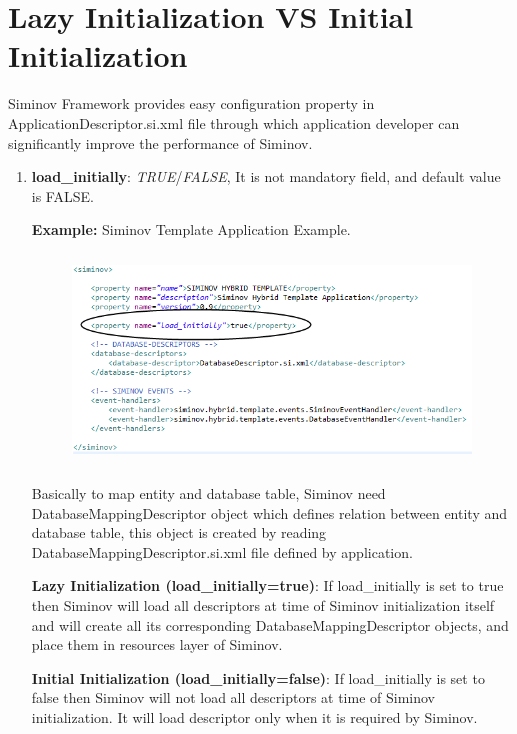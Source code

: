 \section{Lazy Initialization VS Initial Initialization}

Siminov Framework provides easy configuration property in ApplicationDescriptor.si.xml file through which application developer can significantly improve the performance of Siminov. 


\begin{enumerate}

	\item \small \textbf{load\_initially}: \textit{TRUE}/\textit{FALSE}, It is not mandatory field, and default value is FALSE.

		\par
		\textbf{Example:} Siminov Template Application Example.
		\begin{figure}[htbp]
			\centering
				\includegraphics[height=5.6cm]{Resources/siminov_hybrid_template_application_descriptor_load_example.png}
		\end{figure}

		\par
			Basically to map entity and database table, Siminov need DatabaseMappingDescriptor object which defines relation between entity and database table, this object is created by reading DatabaseMappingDescriptor.si.xml file defined by application.

		\par
			\textbf{Lazy Initialization (load\_initially=true)}: If load\_initially is set to true then Siminov will load all descriptors at time of Siminov initialization itself and will create all its corresponding DatabaseMappingDescriptor objects, and place them in resources layer of Siminov.

		\par
			\textbf{Initial Initialization (load\_initially=false)}: If load\_initially is set to false then Siminov will not load all descriptors at time of Siminov initialization. It will load descriptor only when it is required by Siminov.

\end{enumerate}


